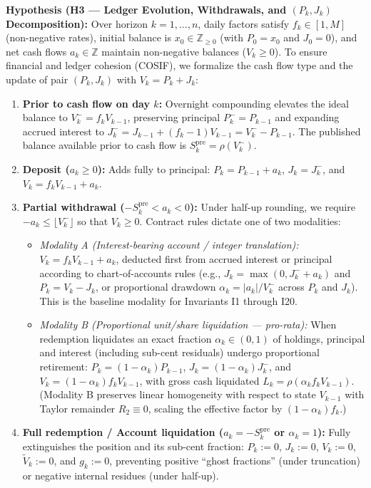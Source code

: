 \documentclass[11pt, a4paper]{article}
\theoremstyle{definition}
\theoremstyle{plain}
\theoremstyle{remark}
\begin{document}
\noindent\textbf{Hypothesis (H3 — Ledger Evolution, Withdrawals, and \texorpdfstring{$(P_k, J_k)$}{(Pk, Jk)} Decomposition):} Over horizon $k = 1, \dots, n$, daily factors satisfy $f_k \in [1, M]$ (non-negative rates), initial balance is $x_0 \in \mathbb{Z}_{\ge 0}$ (with $P_0 = x_0$ and $J_0 = 0$), and net cash flows $a_k \in \mathbb{Z}$ maintain non-negative balances ($V_k \ge 0$). To ensure financial and ledger cohesion (COSIF), we formalize the cash flow type and the update of pair $(P_k, J_k)$ with $V_k = P_k + J_k$:
\begin{enumerate}[label=(\roman*)]
    \item \textbf{Prior to cash flow on day $k$:} Overnight compounding elevates the ideal balance to $V_k^- = f_k V_{k-1}$, preserving principal $P_k^- = P_{k-1}$ and expanding accrued interest to $J_k^- = J_{k-1} + (f_k - 1)V_{k-1} = V_k^- - P_{k-1}$. The published balance available prior to cash flow is $S_k^{\text{pre}} = \rho(V_k^-)$.
    \item \textbf{Deposit ($a_k \ge 0$):} Adds fully to principal: $P_k = P_{k-1} + a_k$, $J_k = J_k^-$, and $V_k = f_k V_{k-1} + a_k$.
    \item \textbf{Partial withdrawal ($-S_k^{\text{pre}} < a_k < 0$):} Under half-up rounding, we require $-a_k \le \lfloor V_k^- \rfloor$ so that $V_k \ge 0$. Contract rules dictate one of two modalities:
    \begin{itemize}
        \item \emph{Modality A (Interest-bearing account / integer translation):} $V_k = f_k V_{k-1} + a_k$, deducted first from accrued interest or principal according to chart-of-accounts rules (e.g., $J_k = \max(0, J_k^- + a_k)$ and $P_k = V_k - J_k$, or proportional drawdown $\alpha_k = |a_k|/V_k^-$ across $P_k$ and $J_k$). This is the baseline modality for Invariants I1 through I20.
        \item \emph{Modality B (Proportional unit/share liquidation --- pro-rata):} When redemption liquidates an exact fraction $\alpha_k \in (0, 1)$ of holdings, principal and interest (including sub-cent residuals) undergo proportional retirement: $P_k = (1 - \alpha_k)P_{k-1}$, $J_k = (1 - \alpha_k)J_k^-$, and $V_k = (1 - \alpha_k)f_k V_{k-1}$, with gross cash liquidated $L_k = \rho(\alpha_k f_k V_{k-1})$. (Modality B preserves linear homogeneity with respect to state $V_{k-1}$ with Taylor remainder $R_2 \equiv 0$, scaling the effective factor by $(1-\alpha_k)f_k$.)
    \end{itemize}
    \item \textbf{Full redemption / Account liquidation ($a_k = -S_k^{\text{pre}}$ or $\alpha_k = 1$):} Fully extinguishes the position and its sub-cent fraction: $P_k := 0$, $J_k := 0$, $V_k := 0$, $\tilde{V}_k := 0$, and $g_k := 0$, preventing positive ``ghost fractions'' (under truncation) or negative internal residues (under half-up).
\end{enumerate}
\end{document}
